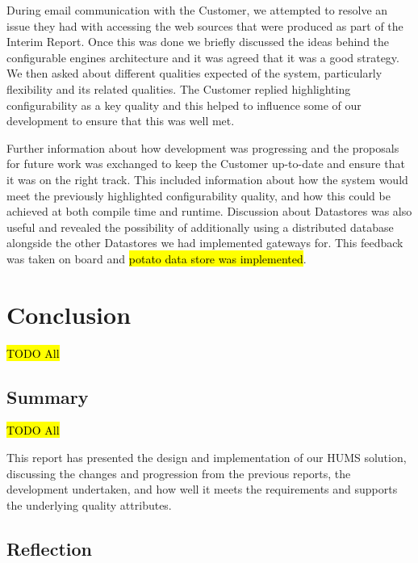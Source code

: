\documentclass[10pt,a4paper]{article}
\begin{document}
During email communication with the Customer, we attempted to resolve an issue they had with accessing the web sources that were produced as part of the Interim Report. Once this was done we briefly discussed the ideas behind the configurable engines architecture and it was agreed that it was a good strategy. We then asked about different qualities expected of the system, particularly flexibility and its related qualities. The Customer replied highlighting configurability as a key quality and this helped to influence some of our development to ensure that this was well met.

Further information about how development was progressing and the proposals for future work was exchanged to keep the Customer up-to-date and ensure that it was on the right track. This included information about how the system would meet the previously highlighted configurability quality, and how this could be achieved at both compile time and runtime. Discussion about Datastores was also useful and revealed the possibility of additionally using a distributed database alongside the other Datastores we had implemented gateways for. This feedback was taken on board and \hl{potato data store was implemented}.



\section{Conclusion}
\label{sec:conclusion}
\hl{TODO All}


\subsection{Summary}
\label{sec:summary}
\hl{TODO All}

This report has presented the design and implementation of our HUMS solution, discussing the changes and progression from the previous reports, the development undertaken, and how well it meets the requirements and supports the underlying quality attributes.


\subsection{Reflection}
\label{sec:reflection}

\end{document}
